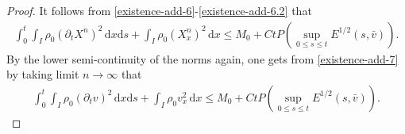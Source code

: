 \documentclass[11pt, reqno]{amsart}
\newcommand{\diff}{\mathrm{d}}
\numberwithin{equation}{section}
\begin{document}
{\begin{proof}
It follows from  \eqref{existence-add-6}-\eqref{existence-add-6.2} that
\begin{equation}\label{existence-add-7}
\begin{aligned}
\int_0^t\int_I \rho_0(\partial_tX^n)^2\,\diff x\diff s
+\int_I\rho_0(X_x^n)^2\,\diff x
\leq M_0+Ct P(\sup_{0\leq s\leq t}E^{1/2}(s,\bar{v})).
\end{aligned}
\end{equation}
By the lower semi-continuity of the norms again, one gets from \eqref{existence-add-7} by taking limit \(n\to\infty\) that 
\begin{equation}\label{existence-add-8}
\begin{aligned}
\int_0^t\int_I \rho_0(\partial_tv)^2\,\diff x\diff s
+\int_I\rho_0v_x^2\,\diff x
\leq M_0+Ct P(\sup_{0\leq s\leq t}E^{1/2}(s,\bar{v})).
\end{aligned}
\end{equation}


\end{proof}}
\end{document}

